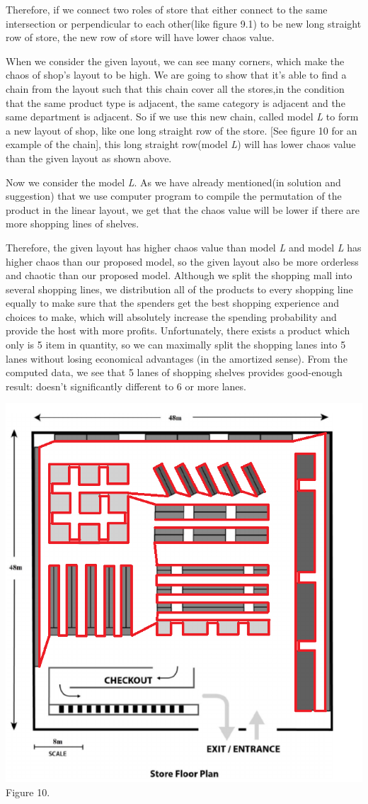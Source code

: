 Therefore, if we connect two roles of store that either connect to the same intersection or perpendicular to each other(like figure 9.1) to be new long straight row of store, the new row of store will have lower chaos value.


When we consider the given layout, we can see many corners, which make the chaos of shop's layout to be high. We are going to show that it's able to find a chain from the layout such that this chain cover all the stores,in the condition that the same product type is adjacent, the same category is adjacent and the same department is adjacent. So if we use this new chain, called model \emph{L} to form a new layout of shop, like one long straight row of the store. [See figure 10 for an example of the chain], this long straight row(model \emph{L}) will has lower chaos value than the given layout as shown above.
\newline

Now we consider the model \emph{L}. As we have already mentioned(in solution and suggestion) that we use computer program to compile the permutation of the product in the linear layout, we get that the chaos value will be lower if there are more shopping lines of shelves.

Therefore, the given layout has higher chaos value than model \emph{L} and model \emph{L} has higher chaos than our proposed model, so the given layout also be more orderless and chaotic than our proposed model. Although we split the shopping mall into several shopping lines, we distribution all of the products to every shopping line equally to make sure that the spenders get the best shopping experience and choices to make, which will absolutely increase the spending probability and provide the host with more profits. Unfortunately, there exists a product which only is 5 item in quantity, so we can maximally split the shopping lanes into 5 lanes without losing economical advantages (in the amortized sense). From the computed data, we see that 5 lanes of shopping shelves provides good-enough result: doesn't significantly different to 6 or more lanes.

\begin{center}
\includegraphics[width=\textwidth]{fig6.PNG}
Figure 10.
\end{center}
